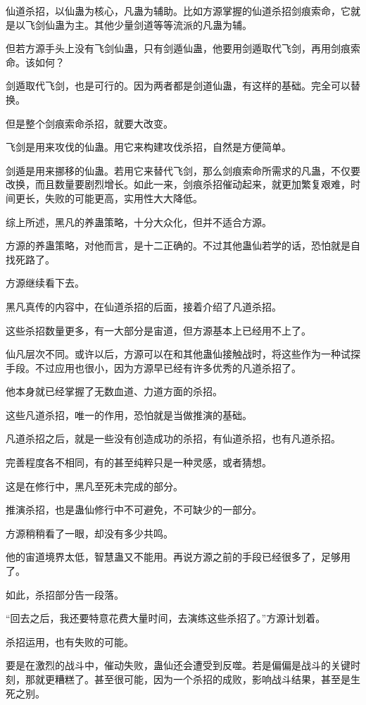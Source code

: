 \begin{this_body}
仙道杀招，以仙蛊为核心，凡蛊为辅助。比如方源掌握的仙道杀招剑痕索命，它就是以飞剑仙蛊为主。其他少量剑道等等流派的凡蛊为辅。

但若方源手头上没有飞剑仙蛊，只有剑遁仙蛊，他要用剑遁取代飞剑，再用剑痕索命。该如何？

剑遁取代飞剑，也是可行的。因为两者都是剑道仙蛊，有这样的基础。完全可以替换。

但是整个剑痕索命杀招，就要大改变。

飞剑是用来攻伐的仙蛊。用它来构建攻伐杀招，自然是方便简单。

剑遁是用来挪移的仙蛊。若用它来替代飞剑，那么剑痕索命所需求的凡蛊，不仅要改换，而且数量要剧烈增长。如此一来，剑痕杀招催动起来，就更加繁复艰难，时间更长，失败的可能更高，实用性大大降低。

综上所述，黑凡的养蛊策略，十分大众化，但并不适合方源。

方源的养蛊策略，对他而言，是十二正确的。不过其他蛊仙若学的话，恐怕就是自找死路了。

方源继续看下去。

黑凡真传的内容中，在仙道杀招的后面，接着介绍了凡道杀招。

这些杀招数量更多，有一大部分是宙道，但方源基本上已经用不上了。

仙凡层次不同。或许以后，方源可以在和其他蛊仙接触战时，将这些作为一种试探手段。不过应用也很小，因为方源早已经有许多优秀的凡道杀招了。

他本身就已经掌握了无数血道、力道方面的杀招。

这些凡道杀招，唯一的作用，恐怕就是当做推演的基础。

凡道杀招之后，就是一些没有创造成功的杀招，有仙道杀招，也有凡道杀招。

完善程度各不相同，有的甚至纯粹只是一种灵感，或者猜想。

这是在修行中，黑凡至死未完成的部分。

推演杀招，也是蛊仙修行中不可避免，不可缺少的一部分。

方源稍稍看了一眼，却没有多少共鸣。

他的宙道境界太低，智慧蛊又不能用。再说方源之前的手段已经很多了，足够用了。

如此，杀招部分告一段落。

“回去之后，我还要特意花费大量时间，去演练这些杀招了。”方源计划着。

杀招运用，也有失败的可能。

要是在激烈的战斗中，催动失败，蛊仙还会遭受到反噬。若是偏偏是战斗的关键时刻，那就更糟糕了。甚至很可能，因为一个杀招的成败，影响战斗结果，甚至是生死之别。


\end{this_body}
